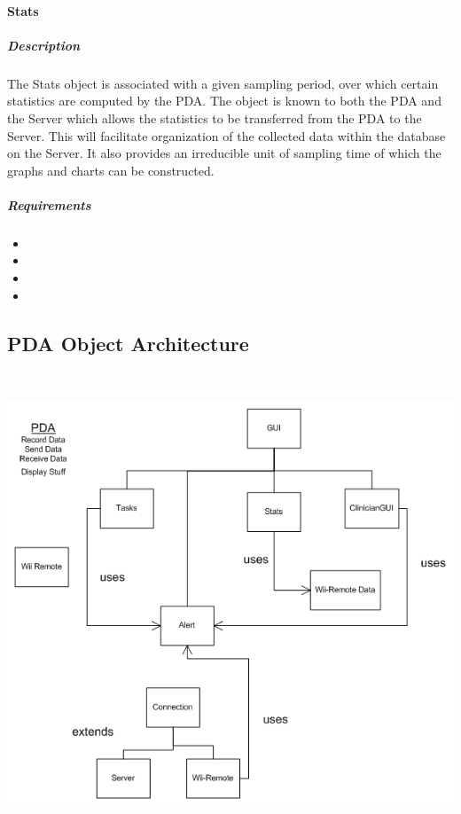 \documentclass{article}
\begin{document}
\paragraph{Stats}\label{sec: Stats Obj}
\subparagraph{Description}
The Stats object is associated with a given sampling period, over which certain statistics are computed by the PDA. The object is known to both the PDA and the Server which allows the statistics to be transferred from the PDA to the Server. This will facilitate organization of the collected data within the database on the Server. It also provides an irreducible unit of sampling time of which the graphs and charts can be constructed.
\subparagraph{Requirements}
\begin{itemize}
\item {}
\item {}
\item {}
\item {}
\end{itemize}

\newpage
\subsection{PDA Object Architecture}

\begin{center}
\includegraphics[width=6in,height=5.45in]{PDA_ooda.png}
\end{center}
\end{document}
